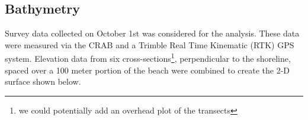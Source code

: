 \subsection{Bathymetry}
\label{sec: bathy}

	Survey data collected on October 1st was considered for the analysis. These data were measured via the CRAB and a Trimble Real Time Kinematic (RTK) GPS system. Elevation data from six cross-sections\footnote{we could potentially add an overhead plot of the transects}, perpendicular to the shoreline, spaced over a 100 meter portion of the beach were combined to create the 2-D surface shown below. 